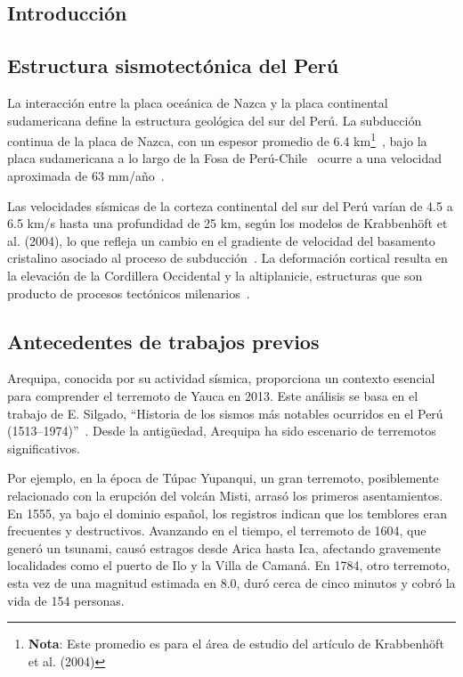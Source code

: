 \documentclass[a4paper,11pt]{article}
\begin{document}
\subsection{Introducción}

\subsection*{Estructura sismotectónica del Perú}

La interacción entre la placa oceánica de Nazca y la placa continental sudamericana define la estructura geológica del sur del Perú. La subducción continua de la placa de Nazca, con un espesor promedio de 6.4 km\footnote{\textbf{Nota}: Este promedio es para el área de estudio del artículo de Krabbenhöft et al. (2004)}~\cite{Krabbenhoft2004}, bajo la placa sudamericana a lo largo de la Fosa de Perú-Chile~\cite{Krabbenhoft2004} ocurre a una velocidad aproximada de 63 mm/año~\cite{VillegasLanza2016}.

Las velocidades sísmicas de la corteza continental del sur del Perú varían de 4.5 a 6.5 km/s hasta una profundidad de 25 km, según los modelos de Krabbenhöft et al. (2004), lo que refleja un cambio en el gradiente de velocidad del basamento cristalino asociado al proceso de subducción~\cite{Krabbenhoft2004}. La deformación cortical resulta en la elevación de la Cordillera Occidental y la altiplanicie, estructuras que son producto de procesos tectónicos milenarios~\cite{VillegasLanza2016}.

\subsection*{Antecedentes de trabajos previos}

Arequipa, conocida por su actividad sísmica, proporciona un contexto esencial para comprender el terremoto de Yauca en 2013. Este análisis se basa en el trabajo de E. Silgado, ``Historia de los sismos más notables ocurridos en el Perú (1513–1974)''~\cite{silgado_ferro_historia_1978}. Desde la antigüedad, Arequipa ha sido escenario de terremotos significativos.

Por ejemplo, en la época de Túpac Yupanqui, un gran terremoto, posiblemente relacionado con la erupción del volcán Misti, arrasó los primeros asentamientos. En 1555, ya bajo el dominio español, los registros indican que los temblores eran frecuentes y destructivos. Avanzando en el tiempo, el terremoto de 1604, que generó un tsunami, causó estragos desde Arica hasta Ica, afectando gravemente localidades como el puerto de Ilo y la Villa de Camaná. En 1784, otro terremoto, esta vez de una magnitud estimada en 8.0, duró cerca de cinco minutos y cobró la vida de 154 personas.
\end{document}
